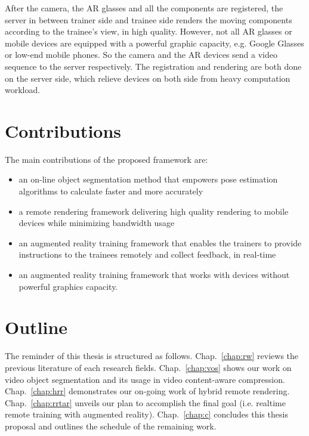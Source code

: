 After the camera, the AR glasses and all the components are registered, the server in between trainer side and trainee side renders the moving components according to the trainee's view, in high quality.
However, not all AR glasses or mobile devices are equipped with a powerful graphic capacity, e.g. Google Glasses or low-end mobile phones.
So the camera and the AR devices send a video sequence to the server respectively. The registration and rendering are both done on the server side, which relieve devices on both side from heavy computation workload.

\section{Contributions}

The main contributions of the proposed framework are:

\begin{itemize}
  \item
  an on-line object segmentation method that empowers pose estimation algorithms to calculate faster and more accurately
  \item
  a remote rendering framework delivering high quality rendering to mobile devices while minimizing bandwidth usage
  \item
  an augmented reality training framework that enables the trainers to provide instructions to the trainees remotely and collect feedback, in real-time
  \item
  an augmented reality training framework that works with devices without powerful graphics capacity.
\end{itemize}

\section{Outline}

The reminder of this thesis is structured as follows. Chap.~\ref{chap:rw} reviews the previous literature of each research fields. Chap.~\ref{chap:vos} shows our work on video object segmentation and its usage in video content-aware compression. Chap.~\ref{chap:hrr} demonstrates our on-going work of hybrid remote rendering. Chap.~\ref{chap:rrtar} unveils our plan to accomplish the final goal (i.e. realtime remote training with augmented reality). Chap.~\ref{chap:c} concludes this thesis proposal and outlines the schedule of the remaining work.
